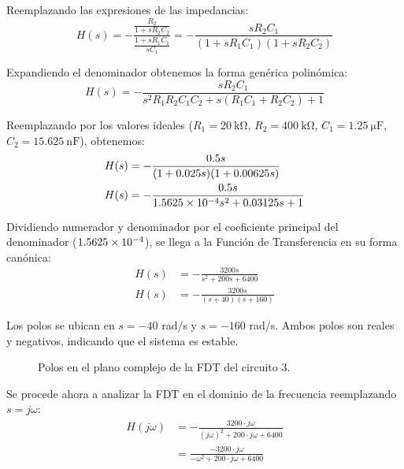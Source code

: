 Reemplazando las expresiones de las impedancias:
\begin{equation}
  \label{eq:fdt-circuito-3-generica}
  H(s) = -\frac{\frac{R_2}{1 + s R_2 C_2}}{\frac{1 + s R_1 C_1}{s C_1}} = -\frac{s R_2 C_1}{(1 + s R_1 C_1)(1 + s R_2 C_2)}
\end{equation}

Expandiendo el denominador obtenemos la forma genérica polinómica:
\begin{equation}
  H(s) = -\frac{s R_2 C_1}{s^2 R_1 R_2 C_1 C_2 + s (R_1 C_1 + R_2 C_2) + 1}
\end{equation}

Reemplazando por los valores ideales ($R_1 = \SI{20}{\kilo\ohm}$, $R_2 = \SI{400}{\kilo\ohm}$, $C_1 = \SI{1.25}{\micro\farad}$, $C_2 = \SI{15.625}{\nano\farad}$), obtenemos:
\begin{align}
  H(s) &= -\frac{0.5 s}{(1 + 0.025 s)(1 + 0.00625 s)}\\
  H(s) &= -\frac{0.5 s}{\num{1.5625d-4} s^2 + 0.03125 s + 1}
\end{align}

Dividiendo numerador y denominador por el coeficiente principal del denominador ($\num{1.5625d-4}$), se llega a la Función de Transferencia en su forma canónica:
\begin{align}
  \label{eq:fdt-circuito-3-ideal}
  H(s) &= -\frac{3200 s}{s^2 + 200 s + 6400}\\
  H(s) &= -\frac{3200 s}{(s + 40)(s + 160)}
  \label{eq:fdt-circuito-3-simplify}
\end{align}

Los polos se ubican en $s = -40$ rad/s y $s = -160$ rad/s. Ambos polos son reales y negativos, indicando que el sistema es estable.

\begin{figure}[H]
  \centering
  
  \caption{Polos en el plano complejo de la FDT del circuito 3.}
  \label{fig:polos_circuito_3}
\end{figure}

Se procede ahora a analizar la FDT en el dominio de la frecuencia reemplazando $s = j\omega$:
\begin{align}
  H(j\omega) &= -\frac{3200 \cdot j\omega}{(j\omega)^2 + 200 \cdot j\omega + 6400} \\
             &= \frac{-3200 \cdot j\omega}{-\omega^2 + 200 \cdot j\omega + 6400}
  \label{eq:fdt-dominio-freq-circuito-3}
\end{align}


